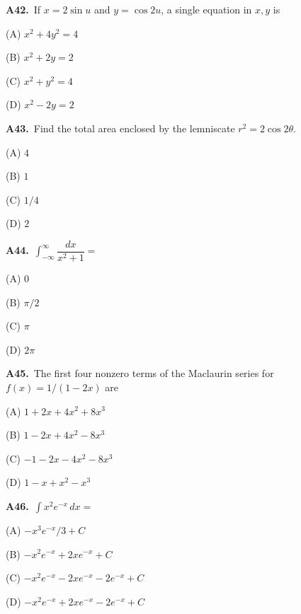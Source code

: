 \documentclass[11pt]{article}
\begin{document}
\bigskip\noindent\textbf{A42.}\ If $x=2\sin u$ and $y=\cos2u$, a single equation in $x,y$ is
\begin{list}{}{\setlength{\leftmargin}{3em}\setlength{\labelwidth}{2.5em}\setlength{\itemsep}{0pt}\setlength{\topsep}{2pt}}
\item[(A)] $x^2+4y^2=4$
\item[(B)] $x^2+2y=2$
\item[(C)] $x^2+y^2=4$
\item[(D)] $x^2-2y=2$
\end{list}

\bigskip\noindent\textbf{A43.}\ Find the total area enclosed by the lemniscate $r^2=2\cos2\theta$.
\begin{list}{}{\setlength{\leftmargin}{3em}\setlength{\labelwidth}{2.5em}\setlength{\itemsep}{0pt}\setlength{\topsep}{2pt}}
\item[(A)] $4$
\item[(B)] $1$
\item[(C)] $1/4$
\item[(D)] $2$
\end{list}

\bigskip\noindent\textbf{A44.}\ $\int_{-\infty}^{\infty}\dfrac{dx}{x^2+1}=$
\begin{list}{}{\setlength{\leftmargin}{3em}\setlength{\labelwidth}{2.5em}\setlength{\itemsep}{0pt}\setlength{\topsep}{2pt}}
\item[(A)] $0$
\item[(B)] $\pi/2$
\item[(C)] $\pi$
\item[(D)] $2\pi$
\end{list}

\bigskip\noindent\textbf{A45.}\ The first four nonzero terms of the Maclaurin series for $f(x)=1/(1-2x)$ are
\begin{list}{}{\setlength{\leftmargin}{3em}\setlength{\labelwidth}{2.5em}\setlength{\itemsep}{0pt}\setlength{\topsep}{2pt}}
\item[(A)] $1+2x+4x^2+8x^3$
\item[(B)] $1-2x+4x^2-8x^3$
\item[(C)] $-1-2x-4x^2-8x^3$
\item[(D)] $1-x+x^2-x^3$
\end{list}

\bigskip\noindent\textbf{A46.}\ $\int x^2e^{-x}\,dx=$
\begin{list}{}{\setlength{\leftmargin}{3em}\setlength{\labelwidth}{2.5em}\setlength{\itemsep}{0pt}\setlength{\topsep}{2pt}}
\item[(A)] $-x^3e^{-x}/3+C$
\item[(B)] $-x^2e^{-x}+2xe^{-x}+C$
\item[(C)] $-x^2e^{-x}-2xe^{-x}-2e^{-x}+C$
\item[(D)] $-x^2e^{-x}+2xe^{-x}-2e^{-x}+C$
\end{list}
\end{document}
